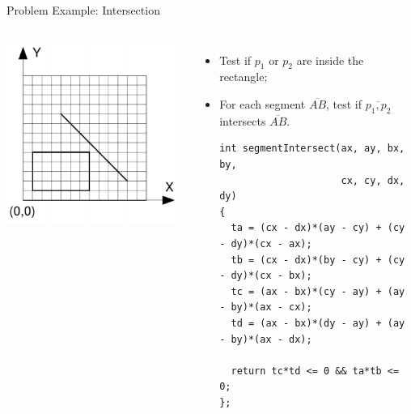 \begin{frame}[fragile]{Problem Example: Intersection}

  \begin{columns}
    \includegraphics[width=\textwidth]{img/intersection_uva}

    \begin{itemize}
      \item Test if $p_1$ or $p_2$ are inside the rectangle;
      \item For each segment $\overline{AB}$, test if $\overline{p_1,p_2}$ intersects $\overline{AB}$.\bigskip
{\smaller
\begin{verbatim}
int segmentIntersect(ax, ay, bx, by,
                     cx, cy, dx, dy)
{
  ta = (cx - dx)*(ay - cy) + (cy - dy)*(cx - ax);
  tb = (cx - dx)*(by - cy) + (cy - dy)*(cx - bx);
  tc = (ax - bx)*(cy - ay) + (ay - by)*(ax - cx);
  td = (ax - bx)*(dy - ay) + (ay - by)*(ax - dx);

  return tc*td <= 0 && ta*tb <= 0;
};
\end{verbatim}}
    \end{itemize}
  \end{columns}
\end{frame}

